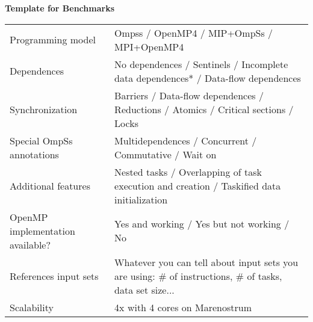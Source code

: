 \section*{}
\label{template}
\centering
\Huge
\textbf{Template for Benchmarks}

\begin{table}[h!]
  \large
  \centering
  \begin{tabular}{|l|l|}
    \hline
    Programming model                & Ompss / OpenMP4 / MIP+OmpSs / MPI+OpenMP4 \\
    Dependences                      & No dependences / Sentinels / Incomplete data dependences* / Data-flow dependences \\
    Synchronization                  & Barriers / Data-flow dependences / Reductions / Atomics / Critical sections / Locks \\
    Special OmpSs annotations        & Multidependences / Concurrent / Commutative / Wait on \\
    Additional features              & Nested tasks / Overlapping of task execution and creation / Taskified data initialization \\
    OpenMP implementation available? & Yes and working / Yes but not working / No \\
    References input sets            & Whatever you can tell about input sets you are using: \# of instructions, \# of tasks, data set size... \\
    Scalability                      & 4x with 4 cores on Marenostrum \\
    \hline
  \end{tabular}
\end{table}

